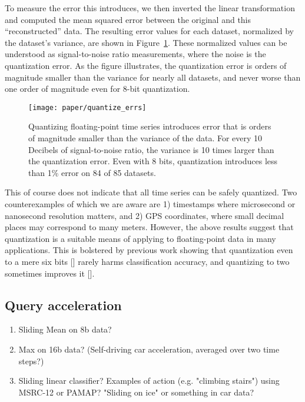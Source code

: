 To measure the error this introduces, we then inverted the linear transformation and computed the mean squared error between the original and this ``reconstructed'' data. The resulting error values for each dataset, normalized by the dataset's variance, are shown in Figure~\ref{fig:quantize_errs}. These normalized values can be understood as signal-to-noise ratio measurements, where the noise is the quantization error. As the figure illustrates, the quantization error is orders of magnitude smaller than the variance for nearly all datasets, and never worse than one order of magnitude even for 8-bit quantization.

\begin{figure}[h]
\begin{center}
    \texttt{[image: paper/quantize\_errs]}
    \caption{Quantizing floating-point time series introduces error that is orders of magnitude smaller than the variance of the data. For every 10 Decibels of signal-to-noise ratio, the variance is 10 times larger than the quantization error. Even with 8 bits, quantization introduces less than 1\% error on 84 of 85 datasets.}
    \label{fig:quantize_errs}
\end{center}
\end{figure}

This of course does not indicate that all time series can be safely quantized. Two counterexamples of which we are aware are 1) timestamps where microsecond or nanosecond resolution matters, and 2) GPS coordinates, where small decimal places may correspond to many meters. However, the above results suggest that quantization is a suitable means of applying \minesp to floating-point data in many applications. This is bolstered by previous work showing that quantization even to a mere six bits [] rarely harms classification accuracy, and quantizing to two sometimes improves it [].

\subsection{Query acceleration}

\begin{enumerate}
\item Sliding Mean on 8b data?
\item Max on 16b data? (Self-driving car acceleration, averaged over two time steps?)
\item Sliding linear classifier? Examples of action (e.g. "climbing stairs") using MSRC-12 or PAMAP? "Sliding on ice" or something in car data?
\end{enumerate}

